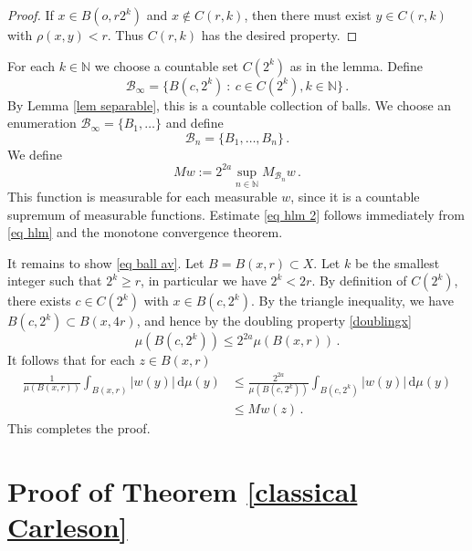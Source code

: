 {\begin{proof}
    If $x \in B(o, r2^k)$ and $x \notin C(r,k)$, then there must exist $y \in C(r,k)$ with $\rho(x,y) < r$. Thus $C(r,k)$ has the desired property.
\end{proof}

For each $k \in \mathbb{N}$ we choose a countable set $C(2^k)$ as in the lemma.
Define
$$
    \mathcal{B}_\infty = \{B(c, 2^k) \ : \ c \in C(2^k), k \in \mathbb{N}\}\,.
$$
By Lemma \ref{lem separable}, this is a countable collection of balls. We choose an enumeration $\mathcal{B}_\infty = \{B_1, \dotsc\}$ and define
$$
    \mathcal{B}_n = \{B_1, \dotsc, B_n\}\,.
$$
We define
$$
    Mw := 2^{2a}\sup_{n \in \mathbb{N}} M_{\mathcal{B}_n}w\,.
$$
This function is measurable for each measurable $w$, since it is a countable supremum of measurable functions. Estimate \eqref{eq hlm 2} follows immediately from \eqref{eq hlm} and the monotone convergence theorem.

It remains to show \eqref{eq ball av}. Let $B = B(x, r) \subset X$. Let $k$ be the smallest integer such that $2^k \ge r$, in particular we have $2^k < 2r$. By definition of $C(2^k)$, there exists $c \in C(2^k)$ with $x \in B(c, 2^k)$. By the triangle inequality, we have $B(c, 2^k) \subset B(x, 4r)$, and hence by the doubling property \eqref{doublingx}
$$
    \mu(B(c, 2^k)) \le 2^{2a} \mu(B(x,r))\,.
$$
It follows that for each $z \in B(x,r)$
\begin{align*}
    \frac{1}{\mu(B(x,r))}\int_{B(x,r)} |w(y)| \, \mathrm{d}\mu(y) &\le \frac{2^{2a}}{\mu(B(c,2^k))}\int_{B(c,2^k)} |w(y)| \, \mathrm{d}\mu(y) \\
    &\le Mw(z)\,.
\end{align*}
This completes the proof.


\section{Proof of Theorem \ref{classical Carleson}}


}
